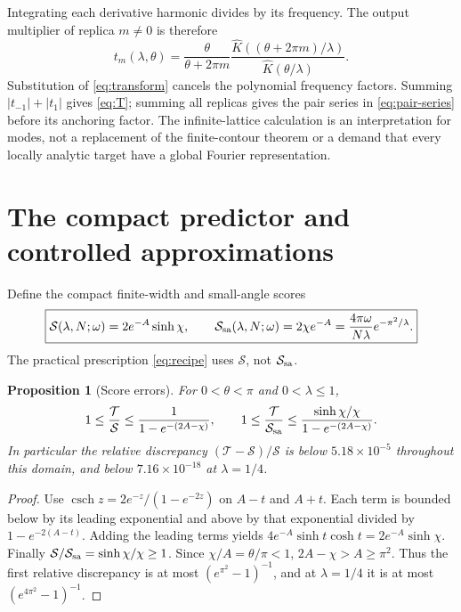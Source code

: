 \documentclass[11pt]{article}
\newtheorem{proposition}[theorem]{Proposition}
\theoremstyle{definition}\newtheorem{definition}[theorem]{Definition}
\theoremstyle{remark}\newtheorem{remark}[theorem]{Remark}
\numberwithin{equation}{section}
\DeclareMathOperator{\csch}{csch}
\newcommand{\T}{\mathcal T}
\newcommand{\Sscore}{\mathcal S}
\newcommand{\Sa}{\mathcal S_{\rm sa}}
\begin{document}
Integrating each derivative harmonic divides by its frequency. The output multiplier of replica $m\ne0$ is therefore
\begin{equation}
 t_m(\lambda,\theta)=\frac{\theta}{\theta+2\pi m}
 \frac{\widehat K((\theta+2\pi m)/\lambda)}{\widehat K(\theta/\lambda)}.
 \label{eq:replica}
\end{equation}
Substitution of \eqref{eq:transform} cancels the polynomial frequency factors. Summing $|t_{-1}|+|t_1|$ gives \eqref{eq:T}; summing all replicas gives the pair series in \eqref{eq:pair-series} before its anchoring factor. The infinite-lattice calculation is an interpretation for modes, not a replacement of the finite-contour theorem or a demand that every locally analytic target have a global Fourier representation.

\section{The compact predictor and controlled approximations}
\label{sec:compact}
Define the compact finite-width and small-angle scores
\begin{equation}
 \boxed{\Sscore(\lambda,N;\omega)=2e^{-A}\sinh\chi,\qquad
 \Sa(\lambda,N;\omega)=2\chi e^{-A}
 =\frac{4\pi\omega}{N\lambda}e^{-\pi^2/\lambda}.}
 \label{eq:scores}
\end{equation}
The practical prescription \eqref{eq:recipe} uses $\Sscore$, not $\Sa$.

\begin{proposition}[Score errors]
\label{prop:score-errors}
For $0<\theta<\pi$ and $0<\lambda\le1$,
\begin{equation}
 1\le\frac{\T}{\Sscore}\le\frac1{1-e^{-(2A-\chi)}},\qquad
 1\le\frac{\T}{\Sa}\le\frac{\sinh\chi/\chi}{1-e^{-(2A-\chi)}}.
 \label{eq:score-errors}
\end{equation}
In particular the relative discrepancy $(\T-\Sscore)/\Sscore$ is below $5.18\times10^{-5}$ throughout this domain, and below $7.16\times10^{-18}$ at $\lambda=1/4$.
\end{proposition}
\begin{proof}
Use $\csch z=2e^{-z}/(1-e^{-2z})$ on $A-t$ and $A+t$. Each term is bounded below by its leading exponential and above by that exponential divided by $1-e^{-2(A-t)}$. Adding the leading terms yields
$4e^{-A}\sinh t\cosh t=2e^{-A}\sinh\chi$.
Finally $\Sscore/\Sa=\sinh\chi/\chi\ge1$. Since $\chi/A=\theta/\pi<1$, $2A-\chi>A\ge\pi^2$. Thus the first relative discrepancy is at most $(e^{\pi^2}-1)^{-1}$, and at $\lambda=1/4$ it is at most $(e^{4\pi^2}-1)^{-1}$.
\end{proof}
\end{document}
